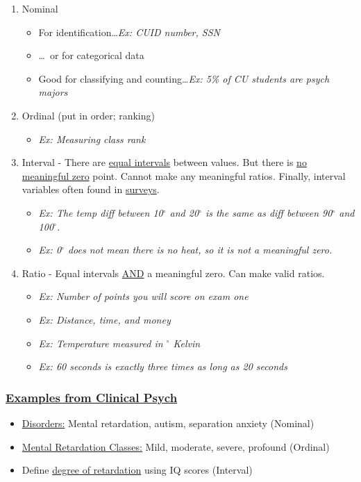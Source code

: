 \documentclass[11pt]{report}
\begin{document}
\begin{enumerate}
    \item Nominal 
    \begin{itemize}
        \item For identification\dots \textit{Ex: CUID number, SSN} 
        \item \dots~or for categorical data 
        \item Good for classifying and counting\dots \textit{Ex: 5\% of CU students are psych majors}
    \end{itemize}
    \item Ordinal (put in order; ranking)
    \begin{itemize}
        \item \textit{Ex: Measuring class rank}
    \end{itemize}
    \item Interval - There are \underline{equal intervals} between values. But there is \underline{no meaningful zero} point. Cannot make any meaningful ratios. Finally, interval variables often found in \underline{surveys}.
    \begin{itemize}
        \item \textit{Ex: The temp diff between 10$^{\circ}$ and 20$^{\circ}$ is the same as diff between 90$^{\circ}$ and 100$^{\circ}$.}
        \item \textit{Ex: 0$^{\circ}$ does not mean there is no heat, so it is not a meaningful zero.}
    \end{itemize}
    \item Ratio - Equal intervals \underline{AND} a meaningful zero. Can make valid ratios. 
    \begin{itemize}
        \item \textit{Ex: Number of points you will score on exam one}
        \item \textit{Ex: Distance, time, and money}
        \item \textit{Ex: Temperature measured in $^{\circ}$ Kelvin}
        \item \textit{Ex: 60 seconds is exactly three times as long as 20 seconds}
    \end{itemize}
\end{enumerate}

\subsubsection{\underline{Examples from Clinical Psych}}
\begin{itemize}
    \item \underline{Disorders:} Mental retardation, autism, separation anxiety (Nominal)
    \item \underline{Mental Retardation Classes:} Mild, moderate, severe, profound (Ordinal)
    \item Define \underline{degree of retardation} using IQ scores (Interval)
\end{itemize}
\end{document}
